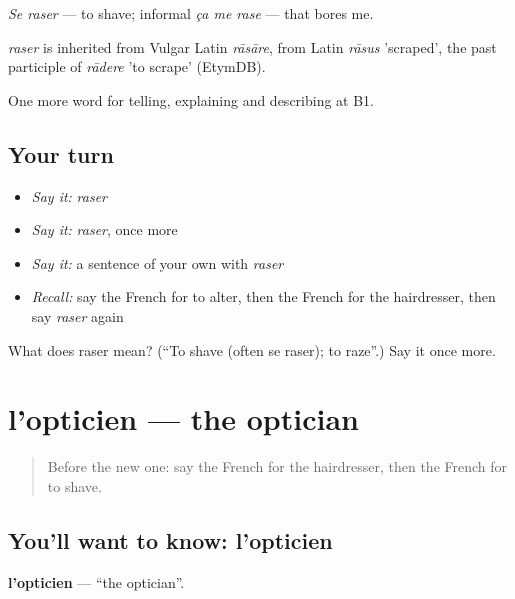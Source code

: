 \emph{Se raser} — to shave; informal \emph{ça me rase} — that bores me.

\begin{cousinweb}
\emph{raser} is inherited from Vulgar Latin \emph{rāsāre}, from Latin \emph{rāsus} 'scraped', the past participle of \emph{rādere} 'to scrape' (EtymDB).
\end{cousinweb}

\begin{grammarlens}[title={What you've built}]
One more word for telling, explaining and describing at B1.
\end{grammarlens}

\subsection*{Your turn}
\begin{itemize}
\raggedright
  \item \emph{Say it:} \emph{raser}
  \item \emph{Say it:} \emph{raser}, once more
  \item \emph{Say it:} a sentence of your own with \emph{raser}
  \item \emph{Recall:} say the French for to alter, then the French for the hairdresser, then say \emph{raser} again
\end{itemize}

\begin{tcolorbox}[breakable,colback=teal!4,colframe=teal!35!black,title={Before you move on}]
What does raser mean? (\textquotedblleft{}To shave (often se raser); to raze\textquotedblright{}.) Say it once more.
\end{tcolorbox}
\section[l'opticien]{l'opticien — the optician}

\label{lesson:FR-C448-opticien}



\begin{quote}
Before the new one: say the French for the hairdresser, then the French for to shave.
\end{quote}

\subsection*{You'll want to know: l'opticien}
\textbf{l'opticien} — \textquotedblleft{}the optician\textquotedblright{}.


